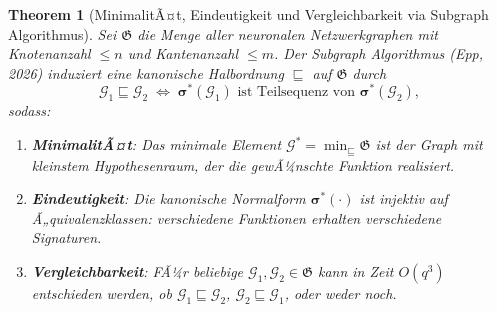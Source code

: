 ﻿\documentclass[12pt, a4paper, openany]{report}
\newtheorem{theorem}{Theorem}[chapter]
\newcommand{\calG}{\mathcal{G}}
\begin{document}
\begin{theorem}[MinimalitÃ¤t, Eindeutigkeit und Vergleichbarkeit via Subgraph Algorithmus]
\label{thm:minimal_unique_comparable}
Sei $\mathfrak{G}$ die Menge aller neuronalen Netzwerkgraphen mit Knotenanzahl
$\leq n$ und Kantenanzahl $\leq m$.  Der Subgraph Algorithmus (Epp, 2026)
induziert eine kanonische Halbordnung $\sqsubseteq$ auf $\mathfrak{G}$ durch
\[
  \calG_1 \sqsubseteq \calG_2
  \;\Leftrightarrow\;
  \bm{\sigma}^*(\calG_1) \text{ ist Teilsequenz von } \bm{\sigma}^*(\calG_2),
\]
sodass:
\begin{enumerate}[label=(\roman*)]
  \item \textbf{MinimalitÃ¤t}: Das minimale Element $\calG^* = \min_{\sqsubseteq} \mathfrak{G}$
    ist der Graph mit kleinstem Hypothesenraum, der die gewÃ¼nschte Funktion realisiert.
  \item \textbf{Eindeutigkeit}: Die kanonische Normalform $\bm{\sigma}^*(\cdot)$
    ist injektiv auf Ã„quivalenzklassen: verschiedene Funktionen erhalten
    verschiedene Signaturen.
  \item \textbf{Vergleichbarkeit}: FÃ¼r beliebige $\calG_1, \calG_2 \in \mathfrak{G}$
    kann in Zeit $O(q^3)$ entschieden werden, ob $\calG_1 \sqsubseteq \calG_2$,
    $\calG_2 \sqsubseteq \calG_1$, oder weder noch.
\end{enumerate}
\end{theorem}
\end{document}
